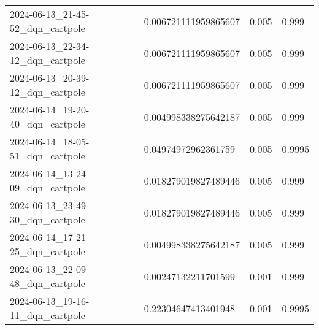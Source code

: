 \documentclass[a4paper,12pt]{article}
\begin{document}
\begin{center}
{\begin{tabular}{llll}
            2024-06-13\_21-45-52\_dqn\_cartpole & 0.006721111959865607 & 0.005        & 0.999          \\
            2024-06-13\_22-34-12\_dqn\_cartpole & 0.006721111959865607 & 0.005        & 0.999          \\
            2024-06-13\_20-39-12\_dqn\_cartpole & 0.006721111959865607 & 0.005        & 0.999          \\
            2024-06-14\_19-20-40\_dqn\_cartpole & 0.004998338275642187 & 0.005        & 0.999          \\
            2024-06-14\_18-05-51\_dqn\_cartpole & 0.04974972962361759  & 0.005        & 0.9995         \\
            2024-06-14\_13-24-09\_dqn\_cartpole & 0.018279019827489446 & 0.005        & 0.999          \\
            2024-06-13\_23-49-30\_dqn\_cartpole & 0.018279019827489446 & 0.005        & 0.999          \\
            2024-06-14\_17-21-25\_dqn\_cartpole & 0.004998338275642187 & 0.005        & 0.999          \\
            2024-06-13\_22-09-48\_dqn\_cartpole & 0.00247132211701599  & 0.001        & 0.999          \\
            2024-06-13\_19-16-11\_dqn\_cartpole & 0.22304647413401948  & 0.001        & 0.9995         \\
        \end{tabular}
    }
\end{center}
\end{document}
